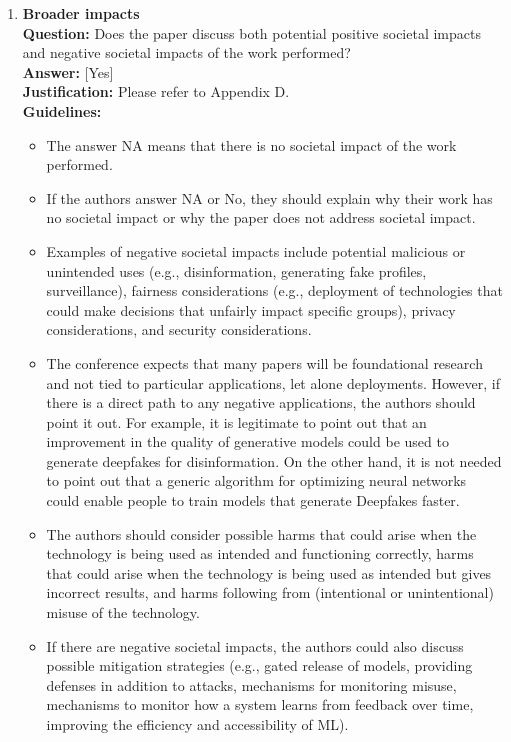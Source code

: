 \begin{enumerate}
\item \textbf{Broader impacts}\\
\textbf{Question:} Does the paper discuss both potential positive societal impacts and negative societal impacts of the work performed?\\
\textbf{Answer:} [Yes]\\
\textbf{Justification:} Please refer to Appendix D.\\
\textbf{Guidelines:}
\begin{itemize}
\item The answer NA means that there is no societal impact of the work performed.
\item If the authors answer NA or No, they should explain why their work has no societal impact or why the paper does not address societal impact.
\item Examples of negative societal impacts include potential malicious or unintended uses (e.g., disinformation, generating fake profiles, surveillance), fairness considerations (e.g., deployment of technologies that could make decisions that unfairly impact specific groups), privacy considerations, and security considerations.
\item The conference expects that many papers will be foundational research and not tied to particular applications, let alone deployments. However, if there is a direct path to any negative applications, the authors should point it out. For example, it is legitimate to point out that an improvement in the quality of generative models could be used to generate deepfakes for disinformation. On the other hand, it is not needed to point out that a generic algorithm for optimizing neural networks could enable people to train models that generate Deepfakes faster.
\item The authors should consider possible harms that could arise when the technology is being used as intended and functioning correctly, harms that could arise when the technology is being used as intended but gives incorrect results, and harms following from (intentional or unintentional) misuse of the technology.
\item If there are negative societal impacts, the authors could also discuss possible mitigation strategies (e.g., gated release of models, providing defenses in addition to attacks, mechanisms for monitoring misuse, mechanisms to monitor how a system learns from feedback over time, improving the efficiency and accessibility of ML).
\end{itemize}


\end{enumerate}
